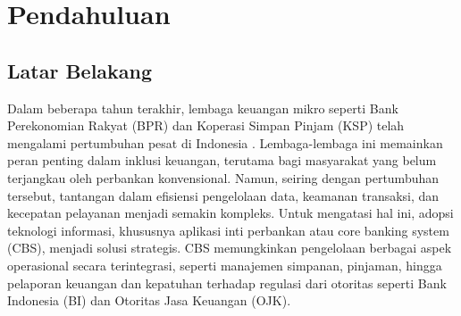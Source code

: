 \documentclass[journal,article,submit,pdftex,moreauthors]{Definitions/mdpi}
\begin{document}



\section{Pendahuluan}

\subsection{Latar Belakang}

Dalam beberapa tahun terakhir, lembaga keuangan mikro seperti Bank Perekonomian Rakyat (BPR) dan Koperasi Simpan Pinjam (KSP) telah mengalami pertumbuhan pesat di Indonesia \cite{OJK2024roadmap}. Lembaga-lembaga ini memainkan peran penting dalam inklusi keuangan, terutama bagi masyarakat yang belum terjangkau oleh perbankan konvensional. Namun, seiring dengan pertumbuhan tersebut, tantangan dalam efisiensi pengelolaan data, keamanan transaksi, dan kecepatan pelayanan menjadi semakin kompleks. Untuk mengatasi hal ini, adopsi teknologi informasi, khususnya aplikasi inti perbankan atau core banking system (CBS), menjadi solusi strategis. CBS memungkinkan pengelolaan berbagai aspek operasional secara terintegrasi, seperti manajemen simpanan, pinjaman, hingga pelaporan keuangan dan kepatuhan terhadap regulasi dari otoritas seperti Bank Indonesia (BI) dan Otoritas Jasa Keuangan (OJK).
\end{document}
